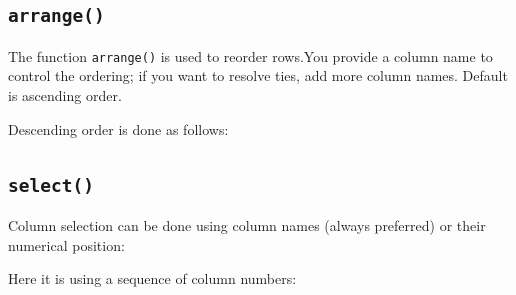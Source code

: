 \documentclass[titlepage]{book}\usepackage{knitr}
\begin{document}
\subsection{\texttt{arrange()}}
The function \texttt{arrange()} is used to reorder rows.You provide a column name to control the ordering; if you want to resolve ties, add more column names. Default is ascending order. 

\begin{knitrout}
\color{fgcolor}\begin{kframe}
\begin{alltt}
 \hlkwb{<-} 
   
\end{alltt}
\end{kframe}
\end{knitrout}
Descending order is done as follows:
\begin{knitrout}
\color{fgcolor}\begin{kframe}
\begin{alltt}
 \hlkwb{<-} 
\hlstd{(bPa[,}\hlstd{],}\hlstd{)}    
\end{alltt}
\end{kframe}
\end{knitrout}

\subsection{\texttt{select()}} 
Column selection can be done using column names (always preferred) or their numerical position:

\begin{knitrout}
\color{fgcolor}\begin{kframe}
\begin{alltt}
 \hlkwb{<-} 
\hlstd{(}
\end{alltt}
\end{kframe}
\end{knitrout}
 Here it is using a sequence of column numbers:
\end{document}
